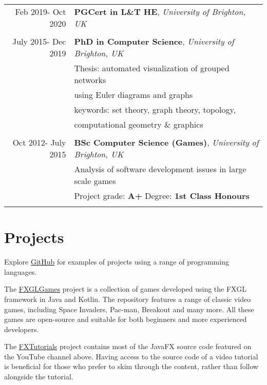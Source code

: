 \documentclass[a4paper,11pt]{article} %
\begin{document}
\begin{tabular}{r|p{11cm}}

Feb 2019- Oct 2020 & \textbf{PGCert in L\&T HE}, \emph{University of Brighton, UK}\\
\multicolumn{2}{c}{} \\


July 2015- Dec 2019 & \textbf{PhD in Computer Science}, \emph{University of Brighton, UK}\\
& Thesis: automated visualization of grouped networks\\
& using Euler diagrams and graphs\\
& keywords: set theory, graph theory, topology,\\
& computational geometry \& graphics \\
\multicolumn{2}{c}{} \\

	
Oct 2012- July 2015 & \textbf{BSc Computer Science (Games)}, \emph{University of Brighton, UK}\\
& Analysis of software development issues in large scale games\\
&\normalsize Project grade: \textbf{A+} Degree: \textbf{1st Class Honours} \\
\multicolumn{2}{c}{} \\

\end{tabular}





\section{Projects}

Explore \href{https://github.com/AlmasB}{GitHub} for examples of projects using a range of programming languages.

The \href{https://github.com/AlmasB/FXGLGames}{FXGLGames} project is a collection of games developed using the FXGL framework in Java and Kotlin. The repository features a range of classic video games, including Space Invaders, Pac-man, Breakout and many more. All these games are open-source and suitable for both beginners and more experienced developers.

The \href{https://github.com/AlmasB/FXTutorials}{FXTutorials} project contains most of the JavaFX source code featured on the YouTube channel above. Having access to the source code of a video tutorial is beneficial for those who prefer to skim through the content, rather than follow alongside the tutorial.
\end{document}
